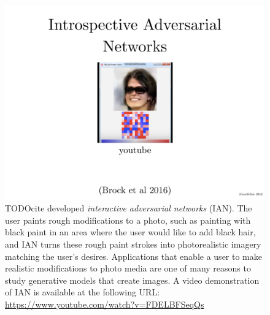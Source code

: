 \begin{figure}
  \centering
  \includegraphics[width=\textwidth]{ian}
  \caption{
    TODOcite developed {\em interactive adversarial networks} (IAN).
    The user paints rough modifications to a photo, such as painting
    with black paint in an area where the user would like to add black
    hair, and IAN turns these rough paint strokes into photorealistic
    imagery matching the user's desires.
    Applications that enable a user to make realistic modifications to
    photo media are one of many reasons to study generative models
    that create images.
    A video demonstration of IAN is available at the following URL:
    \url{https://www.youtube.com/watch?v=FDELBFSeqQs}
  }
  \label{fig:ian}
\end{figure}

